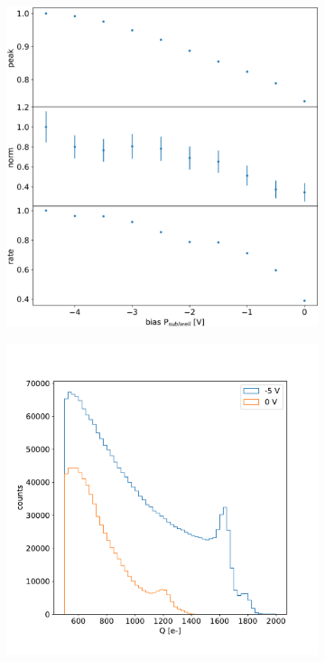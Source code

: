         \begin{figure}
            \centering
            \begin{subfigure}[b]{0.49\textwidth}
                \centering
                \includegraphics[width=\linewidth]{figures/charaterization/Fe_param_vs_bias.pdf}
                \caption{}
                \label{fig:}
            \end{subfigure}
            \hfill
            \begin{subfigure}[b]{0.49\textwidth}
                \centering
                \includegraphics[width=\linewidth]{figures/charaterization/Fe_spectrum_bias.pdf}

\end{subfigure}
\end{figure}
